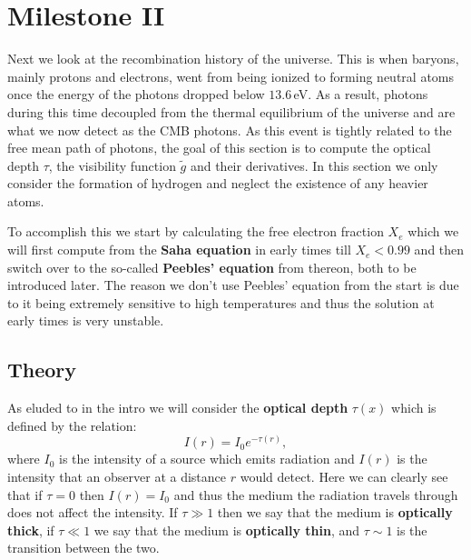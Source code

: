 \documentclass[%
reprint,
 amsmath,amssymb,
 aps,
]{revtex4-2}
\begin{document}
\section{Milestone II}
Next we look at the recombination history of the universe. This is when baryons, mainly protons and electrons, went from being ionized to forming neutral atoms once the energy of the photons dropped below $13.6\,$eV. As a result, photons during this time decoupled from the thermal equilibrium of the universe and are what we now detect as the CMB photons. As this event is tightly related to the free mean path of photons, the goal of this section is to compute the optical depth $\tau$, the visibility function $\tilde g$ and their derivatives. In this section we only consider the formation of hydrogen and neglect the existence of any heavier atoms.

To accomplish this we start by calculating the free electron fraction $X_e$ which we will first compute from the \textbf{Saha equation} in early times till $X_e<0.99$ and then switch over to the so-called \textbf{Peebles' equation} from thereon, both to be introduced later. The reason we don't use Peebles' equation from the start is due to it being extremely sensitive to high temperatures and thus the solution at early times is very unstable.

\subsection{Theory}
As eluded to in the intro we will consider the \textbf{optical depth} $\tau(x)$ which is defined by the relation:
\begin{equation}
	I(r)=I_0e^{-\tau(r)},\label{eq:intensity}
\end{equation}
where $I_0$ is the intensity of a source which emits radiation and $I(r)$ is the intensity that an observer at a distance $r$ would detect. Here we can clearly see that if $\tau=0$ then $I(r)=I_0$ and thus the medium the radiation travels through does not affect the intensity. If $\tau\gg1$ then we say that the medium is \textbf{optically thick}, if $\tau\ll1$ we say that the medium is \textbf{optically thin}, and $\tau\sim1$ is the transition between the two.
\end{document}
